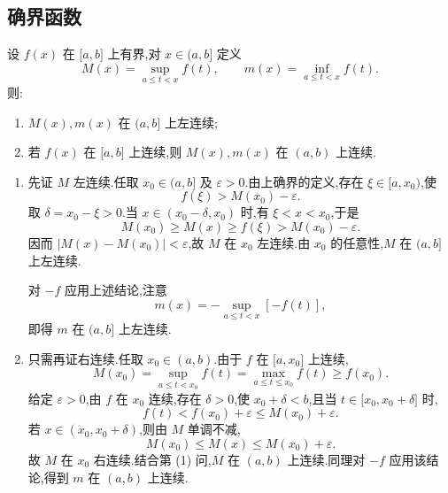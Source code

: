 \subsection{确界函数}

\begin{example}
    设 $f(x)$ 在 $\lbrack a,b\rbrack$ 上有界,对 $x\in(a,b\rbrack$ 定义
    \[
        M(x)=\sup\limits_{a\leq t<x}f(t),\qquad
        m(x)=\inf\limits_{a\leq t<x}f(t).
    \]
    则:
    \begin{enumerate}
        \item $M(x),m(x)$ 在 $(a,b\rbrack$ 上左连续;
        \item 若 $f(x)$ 在 $\lbrack a,b\rbrack$ 上连续,则 $M(x),m(x)$ 在 $(a,b)$ 上连续.
    \end{enumerate}
\end{example}
\exampleblank

\begin{solution}
    \leavevmode
    \begin{enumerate}
        \item 先证 $M$ 左连续.任取 $x_0\in(a,b\rbrack$ 及 $\varepsilon>0$.由上确界的定义,存在 $\xi\in\lbrack a,x_0)$,使
              \[
                  f(\xi)>M(x_0)-\varepsilon.
              \]
              取 $\delta=x_0-\xi>0$.当 $x\in(x_0-\delta,x_0)$ 时,有 $\xi<x<x_0$,于是
              \[
                  M(x_0)\geq M(x)\geq f(\xi)>M(x_0)-\varepsilon.
              \]
              因而 $|M(x)-M(x_0)|<\varepsilon$,故 $M$ 在 $x_0$ 左连续.由 $x_0$ 的任意性,$M$ 在 $(a,b\rbrack$ 上左连续.

              对 $-f$ 应用上述结论,注意
              \[
                  m(x)=-\sup\limits_{a\leq t<x}[-f(t)],
              \]
              即得 $m$ 在 $(a,b\rbrack$ 上左连续.

        \item 只需再证右连续.任取 $x_0\in(a,b)$.由于 $f$ 在 $\lbrack a,x_0\rbrack$ 上连续,
              \[
                  M(x_0)=\sup\limits_{a\leq t<x_0}f(t)
                  =\max\limits_{a\leq t\leq x_0}f(t)\geq f(x_0).
              \]
              给定 $\varepsilon>0$,由 $f$ 在 $x_0$ 连续,存在 $\delta>0$,使 $x_0+\delta<b$,且当 $t\in\lbrack x_0,x_0+\delta\rbrack$ 时,
              \[
                  f(t)<f(x_0)+\varepsilon\leq M(x_0)+\varepsilon.
              \]
              若 $x\in(x_0,x_0+\delta)$,则由 $M$ 单调不减,
              \[
                  M(x_0)\leq M(x)\leq M(x_0)+\varepsilon.
              \]
              故 $M$ 在 $x_0$ 右连续.结合第 (1) 问,$M$ 在 $(a,b)$ 上连续.同理对 $-f$ 应用该结论,得到 $m$ 在 $(a,b)$ 上连续.
    \end{enumerate}
\end{solution}

